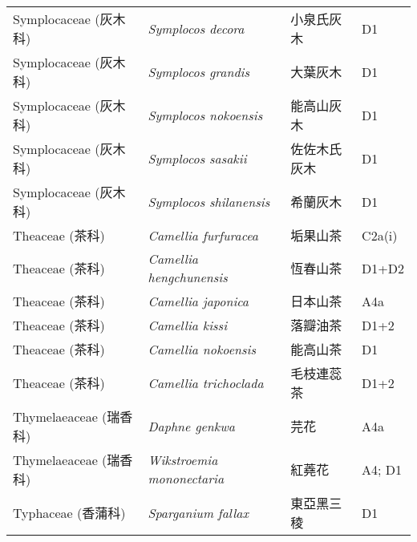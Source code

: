\begin{longtable}{p{3cm}p{5cm}p{3cm}p{4cm}}
    Symplocaceae (灰木科) & \textit{Symplocos decora}  & 小泉氏灰木 & D1 \index{Symplocos@\textit{Symplocos}!decora@\textit{decora}}  \index{小泉氏灰木} \\
    Symplocaceae (灰木科) & \textit{Symplocos grandis}  & 大葉灰木 & D1 \index{Symplocos@\textit{Symplocos}!grandis@\textit{grandis}}  \index{大葉灰木} \\
    Symplocaceae (灰木科) & \textit{Symplocos nokoensis}  & 能高山灰木 & D1 \index{Symplocos@\textit{Symplocos}!nokoensis@\textit{nokoensis}}  \index{能高山灰木} \\
    Symplocaceae (灰木科) & \textit{Symplocos sasakii}  & 佐佐木氏灰木 & D1 \index{Symplocos@\textit{Symplocos}!sasakii@\textit{sasakii}}  \index{佐佐木氏灰木} \\
    Symplocaceae (灰木科) & \textit{Symplocos shilanensis}  & 希蘭灰木 & D1 \index{Symplocos@\textit{Symplocos}!shilanensis@\textit{shilanensis}}  \index{希蘭灰木} \\
    Theaceae (茶科) & \textit{Camellia furfuracea}  & 垢果山茶 & C2a(i) \index{Camellia@\textit{Camellia}!furfuracea@\textit{furfuracea}}  \index{垢果山茶} \\
    Theaceae (茶科) & \textit{Camellia hengchunensis}  & 恆春山茶 & D1+D2 \index{Camellia@\textit{Camellia}!hengchunensis@\textit{hengchunensis}}  \index{恆春山茶} \\
    Theaceae (茶科) & \textit{Camellia japonica}  & 日本山茶 & A4a \index{Camellia@\textit{Camellia}!japonica@\textit{japonica}}  \index{日本山茶} \\
    Theaceae (茶科) & \textit{Camellia kissi}  & 落瓣油茶 & D1+2 \index{Camellia@\textit{Camellia}!kissi@\textit{kissi}}  \index{落瓣油茶} \\
    Theaceae (茶科) & \textit{Camellia nokoensis}  & 能高山茶 & D1 \index{Camellia@\textit{Camellia}!nokoensis@\textit{nokoensis}}  \index{能高山茶} \\
    Theaceae (茶科) & \textit{Camellia trichoclada}  & 毛枝連蕊茶 & D1+2 \index{Camellia@\textit{Camellia}!trichoclada@\textit{trichoclada}}  \index{毛枝連蕊茶} \\
    Thymelaeaceae (瑞香科) & \textit{Daphne genkwa}  & 芫花 & A4a \index{Daphne@\textit{Daphne}!genkwa@\textit{genkwa}}  \index{芫花} \\
    Thymelaeaceae (瑞香科) & \textit{Wikstroemia mononectaria}  & 紅蕘花 & A4; D1 \index{Wikstroemia@\textit{Wikstroemia}!mononectaria@\textit{mononectaria}}  \index{紅蕘花} \\
    Typhaceae (香蒲科) & \textit{Sparganium fallax}  & 東亞黑三稜 & D1 \index{Sparganium@\textit{Sparganium}!fallax@\textit{fallax}}  \index{東亞黑三稜} \\

\end{longtable}
